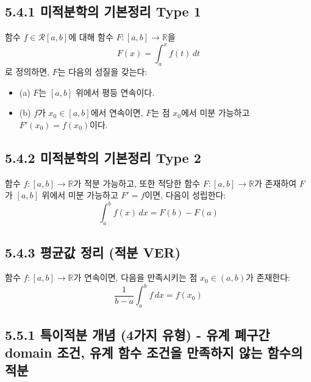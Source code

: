 \documentclass{article}
\begin{document}
\subsection*{5.4.1 미적분학의 기본정리 Type 1}

함수 \( f \in \mathcal{R}[a, b] \)에 대해 함수 \( F: [a, b] \to \mathbb{R} \)을
\[
F(x) = \int_a^x f(t) \, dt
\]
로 정의하면, \( F \)는 다음의 성질을 갖는다:
\begin{itemize}
    \item (a) \( F \)는 \( [a, b] \) 위에서 평등 연속이다.
    \item (b) \( f \)가 \( x_0 \in [a, b] \)에서 연속이면, \( F \)는 점 \( x_0 \)에서 미분 가능하고 \( F'(x_0) = f(x_0) \)이다.
\end{itemize}

\subsection*{5.4.2 미적분학의 기본정리 Type 2}

함수 \( f: [a, b] \to \mathbb{R} \)가 적분 가능하고, 또한 적당한 함수 \( F: [a, b] \to \mathbb{R} \)가 존재하여 \( F \)가 \( [a, b] \) 위에서 미분 가능하고 \( F' = f \)이면, 다음이 성립한다:
\[
\int_a^b f(x) \, dx = F(b) - F(a)
\]

\subsection*{5.4.3 평균값 정리 (적분 VER)}

함수 \( f: [a, b] \to \mathbb{R} \)가 연속이면, 다음을 만족시키는 점 \( x_0 \in (a, b) \)가 존재한다:
\[
\frac{1}{b - a} \int_a^b f \, dx = f(x_0)
\]


\subsection*{5.5.1 특이적분 개념 (4가지 유형) - 유계 폐구간 domain 조건, 유계 함수 조건을 만족하지 않는 함수의 적분}
\end{document}
